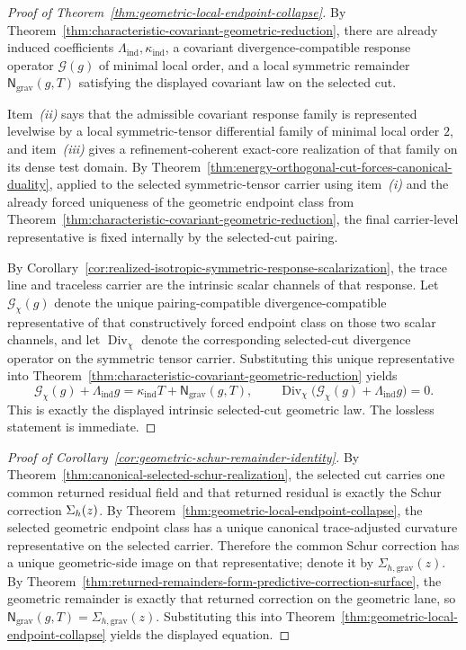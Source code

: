 \begin{proof}[Proof of Theorem~\ref{thm:geometric-local-endpoint-collapse}]
\label{proof:thm:geometric-local-endpoint-collapse}
By Theorem~\ref{thm:characteristic-covariant-geometric-reduction}, there are
already induced coefficients \(\Lambda_{\mathrm{ind}},\kappa_{\mathrm{ind}}\),
a covariant divergence-compatible response operator \(\mathcal G(g)\) of
minimal local order, and a local symmetric remainder
\(\mathsf N_{\mathrm{grav}}(g,T)\) satisfying the displayed covariant law on
the selected cut.

Item~\emph{(ii)} says that the admissible covariant response family is
represented levelwise by a local symmetric-tensor differential family of
minimal local order \(2\), and item~\emph{(iii)} gives a refinement-coherent
exact-core realization of that family on its dense test domain. By
Theorem~\ref{thm:energy-orthogonal-cut-forces-canonical-duality}, applied to
the selected symmetric-tensor carrier using item~\emph{(i)} and the already
forced uniqueness of the geometric endpoint class from
Theorem~\ref{thm:characteristic-covariant-geometric-reduction}, the final
carrier-level representative is fixed internally by the selected-cut pairing.

By
Corollary~\ref{cor:realized-isotropic-symmetric-response-scalarization}, the
trace line and traceless carrier are the intrinsic scalar channels of that
response. Let \(\mathcal G_{\chi}(g)\) denote the unique pairing-compatible
divergence-compatible representative of that constructively forced endpoint
class on those two scalar channels, and let \(\operatorname{Div}_{\chi}\)
denote the corresponding selected-cut divergence operator on the symmetric
tensor carrier. Substituting this unique representative into
Theorem~\ref{thm:characteristic-covariant-geometric-reduction} yields
\[
\mathcal G_{\chi}(g)+\Lambda_{\mathrm{ind}}g
=
\kappa_{\mathrm{ind}}T+\mathsf N_{\mathrm{grav}}(g,T),
\qquad
\operatorname{Div}_{\chi}\bigl(\mathcal G_{\chi}(g)+\Lambda_{\mathrm{ind}}g\bigr)=0.
\]
This is exactly the displayed intrinsic selected-cut geometric law. The
lossless statement is immediate.
\end{proof}

\begin{proof}[Proof of Corollary~\ref{cor:geometric-schur-remainder-identity}]
\label{proof:cor:geometric-schur-remainder-identity}
By Theorem~\ref{thm:canonical-selected-schur-realization}, the selected cut
carries one common returned residual field and that returned residual is
exactly the Schur correction \(\Sigma_{h}(z)\). By
Theorem~\ref{thm:geometric-local-endpoint-collapse}, the selected geometric
endpoint class has a unique canonical trace-adjusted curvature representative on the selected
carrier. Therefore the common Schur correction has a unique geometric-side
image on that representative; denote it by \(\Sigma_{h,\mathrm{grav}}(z)\). By
Theorem~\ref{thm:returned-remainders-form-predictive-correction-surface}, the
geometric remainder is exactly that returned correction on the geometric lane,
so \(\mathsf N_{\mathrm{grav}}(g,T)=\Sigma_{h,\mathrm{grav}}(z)\). Substituting
this into Theorem~\ref{thm:geometric-local-endpoint-collapse} yields the
displayed equation.
\end{proof}

